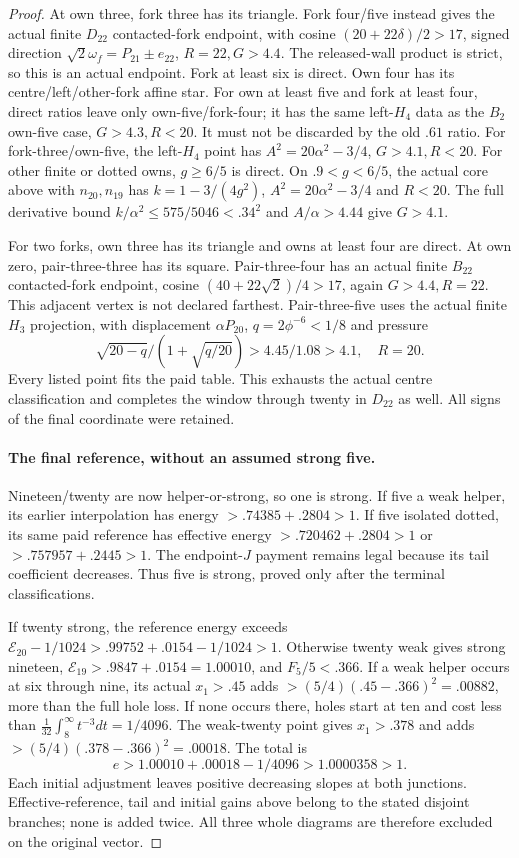 \begin{proof}
At own three, fork three has its triangle. Fork four/five instead
gives the actual finite $D_{22}$ contacted-fork endpoint, with
cosine $(20+22\delta)/2>17$, signed direction
$\sqrt2\omega_f=P_{21}\mathbin\pm e_{22}$, $R=22,G>4.4$.
The released-wall product is strict, so this is an actual endpoint.
Fork at least six is direct. Own four has its centre/left/other-fork
affine star. For own at least five and fork at least four, direct
ratios leave only own-five/fork-four; it has the same left-$H_4$
data as the $B_2$ own-five case, $G>4.3,R<20$.
It must not be discarded by the old $.61$ ratio.
For fork-three/own-five, the left-$H_4$ point has
$A^2=20\alpha^2-3/4$, $G>4.1,R<20$.
For other finite or dotted owns, $g\ge6/5$ is direct. On
$.9<g<6/5$, the actual core above with $n_{20},n_{19}$ has
$k=1-3/(4g^2)$, $A^2=20\alpha^2-3/4$ and $R<20$.
The full derivative bound $k/\alpha^2\le575/5046<.34^2$
and $A/\alpha>4.44$ give $G>4.1$.

For two forks, own three has its triangle and owns at least four
are direct. At own zero, pair-three-three has its square.
Pair-three-four has an actual finite $B_{22}$ contacted-fork
endpoint, cosine $(40+22\sqrt2)/4>17$, again $G>4.4,R=22$.
This adjacent vertex is not declared farthest. Pair-three-five uses
the actual finite $H_3$ projection, with displacement $\alpha P_{20}$,
$q=2\phi^{-6}<1/8$ and pressure
\[
 \sqrt{20-q}/(1+\sqrt{q/20})>4.45/1.08>4.1,\quad R=20.
\]
Every listed point fits the paid table. This exhausts the actual
centre classification and completes the window through twenty in
$D_{22}$ as well. All signs of the final coordinate were retained.

\paragraph{The final reference, without an assumed strong five.}
Nineteen/twenty are now helper-or-strong, so one is strong.
If five a weak helper, its earlier interpolation has energy
$>.74385+.2804>1$. If five isolated dotted, its same paid
reference has effective energy $>.720462+.2804>1$ or
$>.757957+.2445>1$. The endpoint-$J$ payment remains legal
because its tail coefficient decreases. Thus five is strong,
proved only after the terminal classifications.

If twenty strong, the reference energy exceeds
$\mathcal E_{20}-1/1024>.99752+.0154-1/1024>1$.
Otherwise twenty weak gives strong nineteen,
$\mathcal E_{19}>.9847+.0154=1.00010$, and $F_5/5<.366$.
If a weak helper occurs at six through nine, its actual $x_1>.45$
adds $>(5/4)(.45-.366)^2=.00882$, more than the full hole loss.
If none occurs there, holes start at ten and cost less than
$\frac1{32}\int_8^\infty t^{-3}dt=1/4096$.
The weak-twenty point gives $x_1>.378$ and adds
$>(5/4)(.378-.366)^2=.00018$. The total is
\[
 e>1.00010+.00018-1/4096>1.0000358>1.
\]
Each initial adjustment leaves positive decreasing slopes at both
junctions. Effective-reference, tail and initial gains above belong
to the stated disjoint branches; none is added twice. All three
whole diagrams are therefore excluded on the original vector.
\end{proof}

